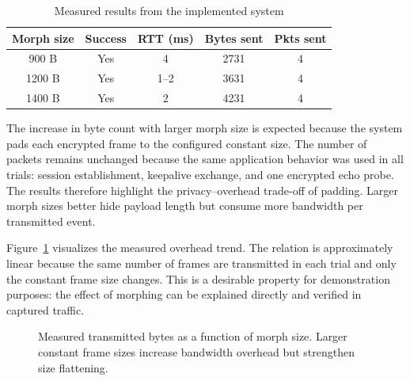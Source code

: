 \documentclass[conference]{IEEEtran}
\begin{document}
\begin{table}[t]
\caption{Measured results from the implemented system}
\label{tab:results}
\centering
\begin{tabular}{c c c c c}
\toprule
Morph size & Success & RTT (ms) & Bytes sent & Pkts sent \\
\midrule
900 B & Yes & 4 & 2731 & 4 \\
1200 B & Yes & 1--2 & 3631 & 4 \\
1400 B & Yes & 2 & 4231 & 4 \\
\bottomrule
\end{tabular}
\end{table}

The increase in byte count with larger morph size is expected because the system pads each encrypted frame to the configured constant size. The number of packets remains unchanged because the same application behavior was used in all trials: session establishment, keepalive exchange, and one encrypted echo probe. The results therefore highlight the privacy--overhead trade-off of padding. Larger morph sizes better hide payload length but consume more bandwidth per transmitted event.

Figure~\ref{fig:trend} visualizes the measured overhead trend. The relation is approximately linear because the same number of frames are transmitted in each trial and only the constant frame size changes. This is a desirable property for demonstration purposes: the effect of morphing can be explained directly and verified in captured traffic.

\begin{figure}[t]
\centering
{}
\caption{Measured transmitted bytes as a function of morph size. Larger constant frame sizes increase bandwidth overhead but strengthen size flattening.}
\label{fig:trend}
\end{figure}
\end{document}

